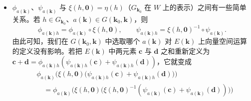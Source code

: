 \begin{itemize}
\begin{align*}
&=\phi_{a(\mathbf{k})}\Big(\xi\big((a(\mathbf{k}),\mathbf{0})^{-1}(g,\mathbf{x})\big)\mathbf{w}\Big)\\
&=\big[\big((a(\mathbf{k}),\mathbf{0}),\ \xi\big((a(\mathbf{k}),\mathbf{0})^{-1}(g,\mathbf{x})\big)\mathbf{w}\big)\big]\\
&=\big[\gamma\big((g,\mathbf{x})^{-1}(a(\mathbf{k}),\mathbf{0})\big)\big((a(\mathbf{k}),\mathbf{0}),\ \xi((a(\mathbf{k}),\mathbf{0})^{-1}(g,\mathbf{x}))\mathbf{w}\big)\big]\\
&=\big[\big((a(\mathbf{k}),\mathbf{0})(a(\mathbf{k}),\mathbf{0})^{-1}(g,\mathbf{x}),\ \xi((g,\mathbf{x})^{-1}(a(\mathbf{k}),\mathbf{0}))\xi((a(\mathbf{k}),\mathbf{0})^{-1}(g,\mathbf{x}))\mathbf{w}\big)\big]\\
&=[((g,\mathbf{x}),\mathbf{w})],
\end{align*}
以及
\begin{align*}
\psi_{a(\mathbf{k})}\big(\phi_{a(\mathbf{k})}(\mathbf{w})\big)
&=\psi_{a(\mathbf{k})}\big([((a(\mathbf{k}),\mathbf{0}),\mathbf{w})]\big)\\
&=\xi\big((a(\mathbf{k}),\mathbf{0})^{-1}(a(\mathbf{k}),\mathbf{0})\big)\mathbf{w}=\mathbf{w}.
\end{align*}
我们用 $\phi_{a(\mathbf{k})}$ 与 $\psi_{a(\mathbf{k})}$ 把 $E(\mathbf{k})$ 与 $W$ 认同。于是若 $\mathbf{c},\mathbf{d}\in E(\mathbf{k})$、$z$ 是复标量，通过定义
\[
\mathbf{c}+\mathbf{d}=\phi_{a(\mathbf{k})}\big(\psi_{a(\mathbf{k})}(\mathbf{c})+\psi_{a(\mathbf{k})}(\mathbf{d})\big),\qquad
z\,\mathbf{c}=\phi_{a(\mathbf{k})}\big(z\,\psi_{a(\mathbf{k})}(\mathbf{c})\big)
\]
把 $E(\mathbf{k})$ 变成向量空间。
\item $\phi_{a(\mathbf{k})}$、$\psi_{a(\mathbf{k})}$ 与 $\xi(h,\mathbf{0})=\eta(h)$（$G_{\mathbf{k}_0}$ 在 $W$ 上的表示）之间有一些简单关系。若 $h\in G_{\mathbf{k}_0}$、$a(\mathbf{k})\in G(\mathbf{k}_0,\mathbf{k})$，则
\[
\phi_{a(\mathbf{k})h}=\phi_{a(\mathbf{k})}\circ\xi(h,\mathbf{0}),\qquad
\psi_{a(\mathbf{k})h}=\xi(h,\mathbf{0})^{-1}\circ\psi_{a(\mathbf{k})}.
\]
由此可知，我们在 $G(\mathbf{k}_0,\mathbf{k})$ 中选取哪个 $a(\mathbf{k})$ 对 $E(\mathbf{k})$ 上向量空间运算的定义没有影响。若把 $E(\mathbf{k})$ 中两元素 $\mathbf{c}$ 与 $\mathbf{d}$ 之和重新定义为 $\mathbf{c}+\mathbf{d}=\phi_{a(\mathbf{k})h}(\psi_{a(\mathbf{k})h}(\mathbf{c})+\psi_{a(\mathbf{k})h}(\mathbf{d}))$，它就变成
\begin{align*}
&\phi_{a(\mathbf{k})}\Big(\xi(h,\mathbf{0})\big(\psi_{a(\mathbf{k})h}(\mathbf{c})+\psi_{a(\mathbf{k})h}(\mathbf{d})\big)\Big)\\
&\quad=\phi_{a(\mathbf{k})}\Big(\xi(h,\mathbf{0})\big(\xi(h,\mathbf{0})^{-1}(\psi_{a(\mathbf{k})}(\mathbf{c})+\psi_{a(\mathbf{k})}(\mathbf{d}))\big)\Big)\\

\end{align*}
\end{itemize}
